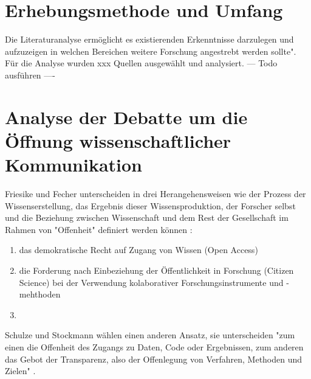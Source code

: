 \section{Erhebungsmethode und Umfang}

Die Literaturanalyse ermöglicht es existierenden Erkenntnisse darzulegen und aufzuzeigen in welchen Bereichen weitere Forschung angestrebt werden sollte"\cite{webster2002analyzing}. Für die Analyse wurden xxx Quellen ausgewählt und analysiert. --- Todo ausführen ----

\section{Analyse der Debatte um die Öffnung wissenschaftlicher Kommunikation}

Friesike und Fecher unterscheiden in drei Herangehensweisen wie der Prozess der Wissenserstellung, das Ergebnis dieser Wissensproduktion, der Forscher selbst und die Beziehung zwischen Wissenschaft und dem Rest der Gesellschaft im Rahmen von "Offenheit" definiert werden können \cite{cite:9}:
\begin{enumerate}
\item das demokratische Recht auf Zugang von Wissen (Open Access)
\item die Forderung nach Einbeziehung der Öffentlichkeit in Forschung (Citizen Science) bei der Verwendung kolaborativer Forschungsinstrumente und -mehthoden
\item
\end{enumerate}

Schulze und Stockmann wählen einen anderen Ansatz, sie unterscheiden "zum einen die Offenheit des Zugangs zu Daten, Code oder Ergebnissen, zum anderen das Gebot der Transparenz, also der Offenlegung von Verfahren, Methoden und Zielen" \cite{schulze_2013_open}.

